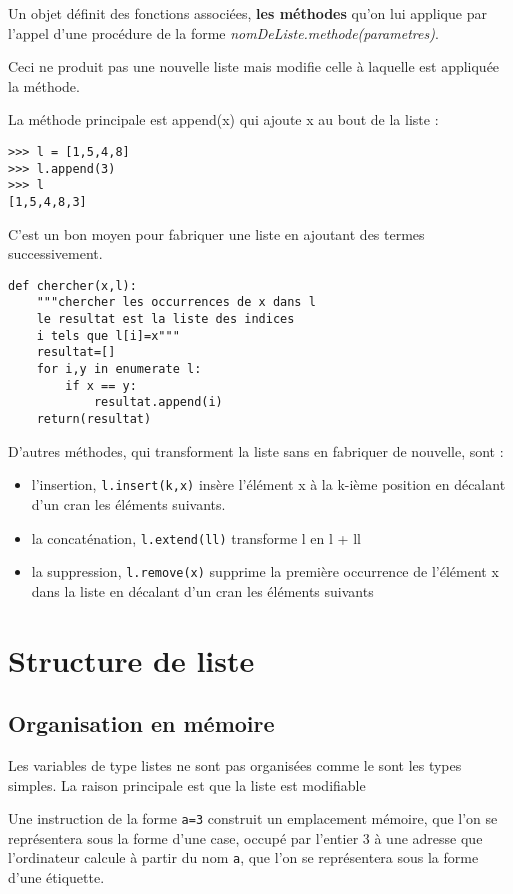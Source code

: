 Un objet définit des fonctions associées, \textbf{les méthodes} qu'on lui applique par l’appel d’une procédure de la forme
\textit{nomDeListe.methode(parametres)}.

Ceci ne produit pas une nouvelle liste mais modifie celle à laquelle est appliquée la méthode.



La méthode principale est append(x) qui ajoute x au bout de la liste :
\begin{lstlisting}
>>> l = [1,5,4,8]
>>> l.append(3)
>>> l
[1,5,4,8,3]
\end{lstlisting}

C’est un bon moyen pour fabriquer une liste en ajoutant des termes successivement.
\begin{lstlisting}
def chercher(x,l):
	"""chercher les occurrences de x dans l
	le resultat est la liste des indices 
	i tels que l[i]=x"""
	resultat=[] 
	for i,y in enumerate l:
		if x == y:
			resultat.append(i) 
	return(resultat) 
\end{lstlisting}


D’autres méthodes, qui transforment la liste sans en fabriquer de nouvelle, sont :

\begin{itemize}
\item l’insertion, \lstinline?l.insert(k,x)? insère l’élément x à la k-ième position en décalant d’un cran les éléments suivants.
\item la concaténation, \lstinline?l.extend(ll)? transforme l en l + ll
\item la suppression, \lstinline?l.remove(x)? supprime la première occurrence de l’élément x dans la liste en décalant d’un cran les éléments suivants
\end{itemize}

\section{Structure de liste}

\subsection{Organisation en mémoire}

Les variables de type listes ne sont pas organisées comme le sont les types simples. La raison principale est que la liste est modifiable 

Une instruction de la forme \lstinline?a=3? construit un emplacement mémoire, que l'on se représentera sous la forme d'une case, occupé par l'entier 3 à une adresse que l'ordinateur calcule à partir du nom {\tt a}, que l'on se représentera sous la forme d'une étiquette.

